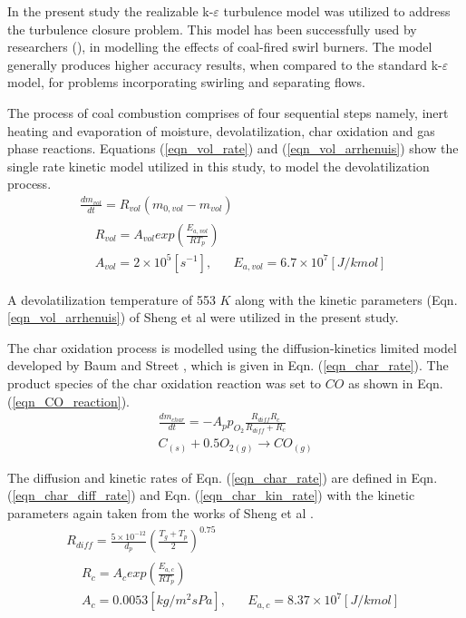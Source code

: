 \documentclass[11pt,cleanfoot]{asme2ej}
\begin{document}
In the present study the realizable k-$\varepsilon$ turbulence model was utilized to address the turbulence closure problem. This model has been successfully used by researchers (\cite{Belosevic2019a, Laubscher2019a, Modlinski2019}), in modelling the effects of coal-fired swirl burners. The model generally produces higher accuracy results, when compared to the standard k-$\varepsilon$ model, for problems incorporating swirling and separating flows.

The process of coal combustion comprises of four sequential steps namely, inert heating and evaporation of moisture, devolatilization, char oxidation and gas phase reactions. Equations (\ref{eqn_vol_rate}) and (\ref{eqn_vol_arrhenuis}) show the single rate kinetic model utilized in this study, to model the devolatilization process.
\begin{gather}
\frac{dm_{vol}}{dt} = R_{vol}(m_{0,vol}-m_{vol}) \label{eqn_vol_rate} \\
\begin{split}
&R_{vol} = A_{vol}exp\left(\frac{E_{a,vol}}{RT_p}\right)\\
&A_{vol} = 2\times10^5 [s^{-1}],\,\,\,\,\,\,\,\,\,\,E_{a,vol} = 6.7\times10^7 [J/kmol] \label{eqn_vol_arrhenuis}
\end{split}
\end{gather}

A devolatilization temperature of 553 $K$ \cite{Ranade2015} along with the kinetic parameters (Eqn. \ref{eqn_vol_arrhenuis}) of Sheng et al \cite{Sheng2004} were utilized in the present study.

The char oxidation process is modelled using the diffusion-kinetics limited model developed by Baum and Street \cite{Baum1971}, which is given in Eqn. (\ref{eqn_char_rate}). The product species of the char oxidation reaction was set to $CO$ as shown in Eqn. (\ref{eqn_CO_reaction}). 
\begin{gather}
\frac{dm_{char}}{dt} = -A_p p_{O_{2}} \frac{R_{diff}R_c}{R_{diff} + R_c}  \label{eqn_char_rate}\\
C_{(s)}+0.5O_{2(g)}\to CO_{(g)} \label{eqn_CO_reaction}
\end{gather}

The diffusion and kinetic rates of Eqn. (\ref{eqn_char_rate}) are defined in Eqn. (\ref{eqn_char_diff_rate})  and Eqn. (\ref{eqn_char_kin_rate}) with the kinetic parameters again taken from the works of Sheng et al \cite{Sheng2004}.
\begin{gather}
R_{diff} = \frac{5\times10^{-12}}{d_p} \left(\frac{T_g+T_p}{2}\right)^{0.75} \label{eqn_char_diff_rate}\\
\begin{split}
&R_{c} = A_{c}exp\left(\frac{E_{a,c}}{RT_p}\right)\\
&A_{c} = 0.0053 [kg/m^2sPa],\,\,\,\,\,\,\,\,\,\,E_{a,c} = 8.37\times10^7 [J/kmol]
\end{split}
 \label{eqn_char_kin_rate}
\end{gather}
\end{document}
